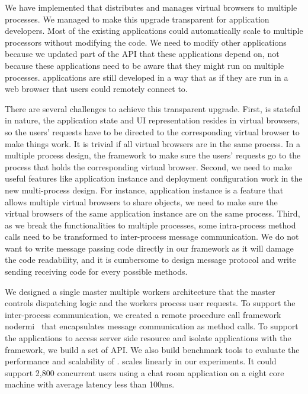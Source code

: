 We have implemented \cbtwo that distributes and manages virtual browsers
to multiple processes.
We managed to make this upgrade transparent for application developers.
Most of the existing applications could automatically scale to 
multiple processors without modifying the code.
We need to modify other applications because we updated part of
the \cb{} API that these applications depend on,
not because these applications need to be aware that they might run on
multiple processes.
\cb{} applications are still developed in a way that as if they are run in
a web browser that users could remotely connect to.

There are several challenges to achieve this transparent upgrade.
First, \cb{} is stateful in nature, 
the application state and UI representation resides in virtual browsers,
so the users' requests have to be directed to the corresponding virtual browser
to make things work.
It is trivial if all virtual browsers are in the same process.
In a multiple process design,
the framework to make sure the users' requests go to the process that holds the
corresponding virtual browser.
Second, we need to make useful features like application instance and
deployment configuration work in the new multi-process design.
For instance, application instance is a feature that allows multiple virtual browsers
to share objects, we need to make sure the virtual browsers of the same application 
instance are on the same process.
Third, as we break the functionalities to multiple processes,
some intra-process method calls need to be transformed to inter-process message
communication.
We do not want to write message passing code directly in our framework as it
will damage the code readability, and it is cumbersome to design message protocol
and write sending receiving code for every possible methods.

We designed a single master multiple workers architecture that the master
controls dispatching logic and the workers process user requests.
To support the inter-process communication,
we created a remote procedure call framework nodermi~\cite{nodermi} that
encapsulates message communication as method calls.
To support the applications to access server side resource
and isolate applications with the framework,
we build a set of API. %
We also build benchmark tools to evaluate the performance and scalability of \cbtwo.
\cbtwo scales linearly in our experiments. 
It could support 2,800 concurrent users using a chat room application
on a eight core machine with average latency less than 100ms.
